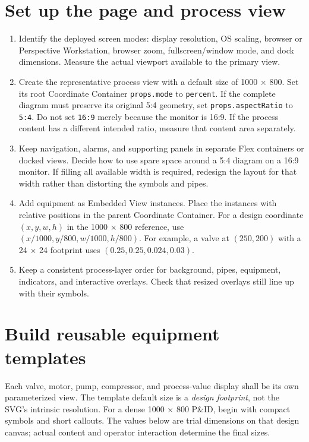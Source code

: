 \section{Set up the page and process view}
\begin{enumerate}[leftmargin=*,itemsep=3pt]
\item Identify the deployed screen modes: display resolution, OS scaling, browser or Perspective Workstation, browser zoom, fullscreen/window mode, and dock dimensions. Measure the actual viewport available to the primary view.
\item Create the representative process view with a default size of 1000 $\times$ 800. Set its root Coordinate Container \texttt{props.mode} to \texttt{percent}. If the complete diagram must preserve its original 5:4 geometry, set \texttt{props.aspectRatio} to \texttt{5:4}. Do not set \texttt{16:9} merely because the monitor is 16:9. If the process content has a different intended ratio, measure that content area separately.
\item Keep navigation, alarms, and supporting panels in separate Flex containers or docked views. Decide how to use spare space around a 5:4 diagram on a 16:9 monitor. If filling all available width is required, redesign the layout for that width rather than distorting the symbols and pipes.
\item Add equipment as Embedded View instances. Place the instances with relative positions in the parent Coordinate Container. For a design coordinate $(x,y,w,h)$ in the 1000 $\times$ 800 reference, use $(x/1000,y/800,w/1000,h/800)$. For example, a valve at $(250,200)$ with a 24 $\times$ 24 footprint uses $(0.25,0.25,0.024,0.03)$.
\item Keep a consistent process-layer order for background, pipes, equipment, indicators, and interactive overlays. Check that resized overlays still line up with their symbols.
\end{enumerate}

\section{Build reusable equipment templates}
Each valve, motor, pump, compressor, and process-value display shall be its own parameterized view. The template default size is a \emph{design footprint}, not the SVG's intrinsic resolution. For a dense 1000 $\times$ 800 P\&ID, begin with compact symbols and short callouts. The values below are trial dimensions on that design canvas; actual content and operator interaction determine the final sizes.

